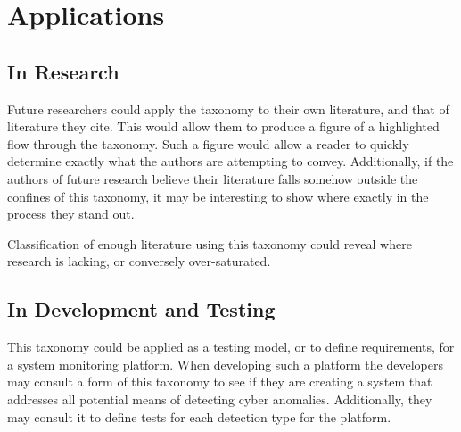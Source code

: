 \section{Applications}
\subsection{In Research}
Future researchers could apply the taxonomy to their own literature, and that of literature they cite. 
This would allow them to produce a figure of a highlighted flow through the taxonomy.
Such a figure would allow a reader to quickly determine exactly what the authors are attempting to convey. 
Additionally, if the authors of future research believe their literature falls somehow outside the confines of this taxonomy, it may be interesting to show where exactly in the process they stand out.

Classification of enough literature using this taxonomy could reveal where research is lacking, or conversely over-saturated. 

\subsection{In Development and Testing}
This taxonomy could be applied as a testing model, or to define requirements, for a system monitoring platform. 
When developing such a platform the developers may consult a form of this taxonomy to see if they are creating a system that addresses all potential means of detecting cyber anomalies. 
Additionally, they may consult it to define tests for each detection type for the platform.